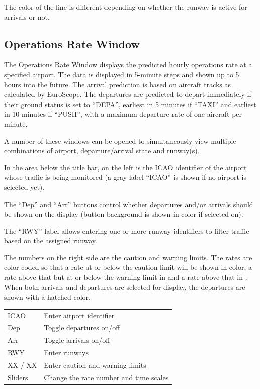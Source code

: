 \documentclass[a4paper,oneside,11pt]{memoir}
\begin{document}
The color of the line is different depending on whether the runway is active for arrivals or not.

\subsection{Operations Rate Window}
\label{win:orw}

\bigskip


The Operations Rate Window displays the predicted hourly operations rate at a specified airport. The data is displayed in 5-minute steps and shown up to 5 hours into the future. The arrival prediction is based on aircraft tracks as calculated by EuroScope. The departures are predicted to depart immediately if their ground status is set to “DEPA”, earliest in 5 minutes if “TAXI” and earliest in 10 minutes if “PUSH”, with a maximum departure rate of one aircraft per minute.

\bigskip

A number of these windows can be opened to simultaneously view multiple combinations of airport, departure/arrival state and runway(s).

\bigskip

In the area below the title bar, on the left is the ICAO identifier of the airport whose traffic is being monitored (a gray label “ICAO” is shown if no airport is selected yet).

\bigskip

The “Dep” and “Arr” buttons control whether departures and/or arrivals should be shown on the display (button background is shown in  color if selected on).

\bigskip

The “RWY” label allows entering one or more runway identifiers to filter traffic based on the assigned runway.

\bigskip

The numbers on the right side are the caution and warning limits. The rates are color coded so that a rate at or below the caution limit will be shown in  color, a rate above that but at or below the warning limit in  and a rate above that in . When both arrivals and departures are selected for display, the departures are shown with a hatched color.

\begin{longtable}{p{2.5cm} p{10cm}}
    ICAO        & Enter airport identifier\\
    Dep         & Toggle departures on/off\\
    Arr         & Toggle arrivals on/off\\
    RWY         & Enter runways\\
    XX / XX     & Enter caution and warning limits\\
    Sliders     & Change the rate number and time scales  \\  
\end{longtable}
\end{document}

